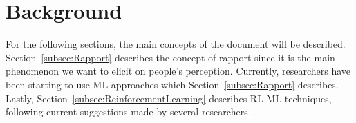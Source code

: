 \section{Background}
\label{sec:Background}

For the following sections, the main concepts of the document will be described. Section~\ref{subsec:Rapport} describes the concept of rapport since it is the main phenomenon we want to elicit on people's perception. Currently, researchers have been starting to use \acl{ML} approaches which Section~\ref{subsec:Rapport} describes. Lastly, Section~\ref{subsec:ReinforcementLearning} describes \acl{RL} \ac{ML} techniques, following current suggestions made by several researchers~\cite{Thomaz2006, Kok2012, Sequeira2016, Zhao2014, Papangelis2014}.



